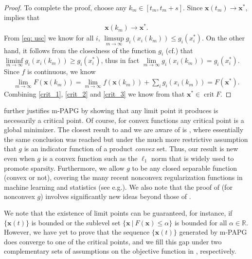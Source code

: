 \documentclass[leqno,onefignum,onetabnum]{siamart0516}
\newcommand{\eg}{{e.g.}\xspace}
\newcommand{\cf}{{cf.}\xspace}
\newcommand{\xb}{\mathbf{x}}
\newcommand{\RR}{\mathds{R}}
\newcommand{\crit}{\mathop{\mathrm{crit}}}
\newcommand{\mspg}{\textsf{m-PAPG}\xspace}
\begin{document}
\begin{proof}
	To complete the proof, choose any $k_m\in [t_m, t_m+s]$. Since $\xb(t_m) \to \xb^*$,  implies that 
	\begin{align}
	\label{crit_2}
	\xb(k_m) \to \xb^*.
	\end{align}	
	From \cref{eq: usc} we know for all $i$, $\limsup\limits_{m\to\infty} g_i(x_i(k_m)) \leq g_i(x_i^*)$. On the other hand, it follows from the closedness of the function $g_i$ (\cf {}) that $\liminf\limits_{m\to\infty} g_i(x_i(k_m)) \geq g_i(x_i^*)$, thus in fact $ \lim\limits_{m\to\infty} g_i(x_i(k_m)) = g_i(x_i^*) $. Since $f$ is continuous, we know 
	\begin{align}
	\label{crit_3}
	\lim_{m\to \infty} F(\xb(k_m)) = \lim_{m\to \infty} f(\xb(k_m)) + \sum_i g_i(x_i(k_m)) = F(\xb^*).
	\end{align}
	Combining \cref{crit_1}, \cref{crit_2} and \cref{crit_3} we know  from  that $\xb^* \in \crit{F}$.
\end{proof}

 further justifies \mspg by showing that any limit point it produces is necessarily a critical point. Of course, for convex functions any critical point is a global minimizer. The closest result to  and  we are aware of is \cite[Proposition 7.5.3]{BT_parallel}, where essentially the same conclusion was reached but under the much more restrictive assumption that $g$ is an indicator function of a product \emph{convex} set. Thus, our result is new even when $g$ is a convex function such as the $\ell_1$ norm that is widely used to promote sparsity. Furthermore, we allow $g$ to be any closed separable function (convex or not), covering the many recent nonconvex regularization functions in machine learning and statistics (see \eg \cite{FanLi01,Mazumderetal11,Zhang10,ZhangZhang12}). We also note that the proof of  (for nonconvex $g$) involves significantly new ideas beyond those of \cite{BT_parallel}.
 

We note that the existence of limit points can be guaranteed, for instance, if $\{\xb(t)\}$ is bounded or the sublevel set $\{\xb ~|~ F(\xb) \le \alpha \}$ is bounded for all $\alpha \in \RR$. 
However, we have yet to prove that the sequence $\{ \xb(t) \}$ generated by \mspg does converge to one of the critical points, and we fill this gap under two complementary sets of assumptions on the objective function in , respectively. 
\end{document}
